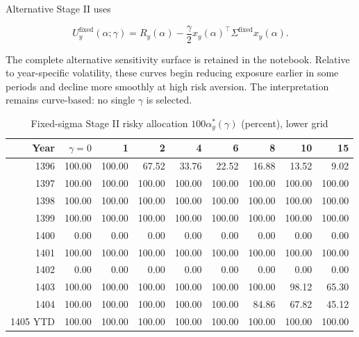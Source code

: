 \documentclass[11pt,a4paper]{article}
\begin{document}
Alternative Stage II uses

\begin{equation}
U_y^{\text{fixed}}(\alpha;\gamma)
=R_y(\alpha)-\frac{\gamma}{2}
x_y(\alpha)^\top\Sigma^{\text{fixed}}x_y(\alpha).
\end{equation}

The complete alternative sensitivity surface is retained in the notebook. Relative to
year-specific volatility, these curves begin reducing exposure earlier in some periods and
decline more smoothly at high risk aversion. The interpretation remains curve-based: no single
$\gamma$ is selected.

\begin{landscape}
\begin{table}[p]
\centering
\scriptsize
\caption{Fixed-sigma Stage II risky allocation $100\alpha_y^*(\gamma)$ (percent), lower grid}
\begin{tabular}{rrrrrrrrr}
\toprule
Year & $\gamma=0$ & 1 & 2 & 4 & 6 & 8 & 10 & 15 \\
\midrule
1396 & 100.00&100.00&67.52&33.76&22.52&16.88&13.52&9.02\\
1397 & 100.00&100.00&100.00&100.00&100.00&100.00&100.00&100.00\\
1398 & 100.00&100.00&100.00&100.00&100.00&100.00&100.00&100.00\\
1399 & 100.00&100.00&100.00&100.00&100.00&100.00&100.00&100.00\\
1400 & 0.00&0.00&0.00&0.00&0.00&0.00&0.00&0.00\\
1401 & 100.00&100.00&100.00&100.00&100.00&100.00&100.00&100.00\\
1402 & 0.00&0.00&0.00&0.00&0.00&0.00&0.00&0.00\\
1403 & 100.00&100.00&100.00&100.00&100.00&100.00&98.12&65.30\\
1404 & 100.00&100.00&100.00&100.00&100.00&84.86&67.82&45.12\\
1405 YTD & 100.00&100.00&100.00&100.00&100.00&100.00&100.00&100.00\\
\bottomrule
\end{tabular}
\end{table}


\end{landscape}
\end{document}
